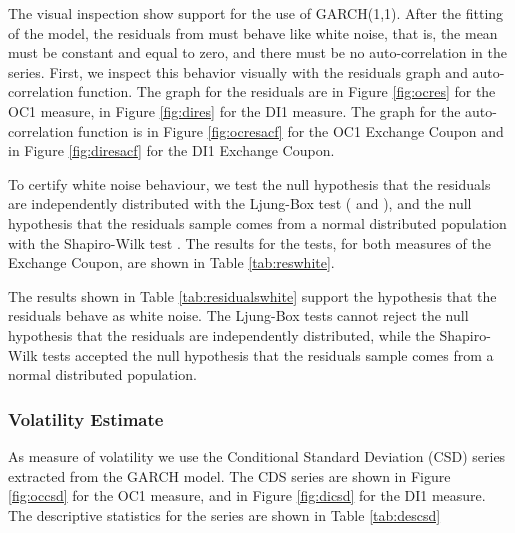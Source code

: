 \documentclass[a4paper]{article}
\begin{document}






The visual inspection show support for the use of GARCH(1,1). After the fitting of the model, the residuals from must behave like white noise, that is, the mean must be constant and equal to zero, and there must be no auto-correlation in the series. First, we inspect this behavior visually with the residuals graph and auto-correlation function. The graph for the residuals are in Figure \ref{fig:ocres} for the OC1 measure, in Figure \ref{fig:dires} for the DI1 measure. The graph for the auto-correlation function is in Figure \ref{fig:ocresacf} for the OC1 Exchange Coupon and in Figure \ref{fig:diresacf} for the DI1 Exchange Coupon.









To certify white noise behaviour, we test the null hypothesis that the residuals are independently distributed with the Ljung-Box test (\citet{boxpierce} and \citet{ljungbox}), and the null hypothesis that the residuals sample comes from a normal distributed population with the Shapiro-Wilk test \citet{shapirowilk}. The results for the tests, for both measures of the Exchange Coupon, are shown in Table \ref{tab:reswhite}.



The results shown in Table \ref{tab:residualswhite} support the hypothesis that the residuals behave as white noise. The Ljung-Box tests cannot reject the null hypothesis that the residuals are independently distributed, while the Shapiro-Wilk tests accepted the null hypothesis that the residuals sample comes from a normal distributed population.

\subsubsection{Volatility Estimate}

As measure of volatility we use the Conditional Standard Deviation (CSD) series extracted from the GARCH model. The CDS series are shown in Figure \ref{fig:occsd} for the OC1 measure, and in Figure \ref{fig:dicsd} for the DI1 measure. The descriptive statistics for the series are shown in Table \ref{tab:descsd}
\end{document}
